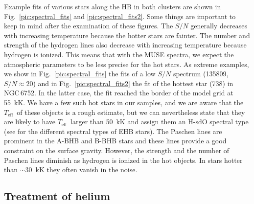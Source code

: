 \documentclass{aa}
\newcommand{\teff}{$T_{\text{eff}}$}
\newcommand{\ngc}{NGC\,6752}
\begin{document}
Example fits of various stars along the HB in both clusters are shown in Fig.~\ref{pic:spectral_fits} and \ref{pic:spectral_fits2}. 
Some things are important to keep in mind after the examination of these figures. The $S/N$ generally decreases with increasing temperature because the hotter stars are fainter. The number and strength of the hydrogen lines also decrease with increasing temperature because hydrogen is ionized. This means that with the MUSE spectra, we expect the atmospheric parameters to be less precise for the hot stars. As extreme examples, we show in Fig.~\ref{pic:spectral_fits} the fits of a low $S/N$ spectrum (135809, $S/N \approx 20$) and in Fig.~\ref{pic:spectral_fits2} the fit of the hottest star (738) in \ngc. In the latter case, the fit reached the border of the model grid at 55~kK. We have a few such hot stars in our samples, and we are aware that the \teff\ of these objects is a rough estimate, but we can nevertheless state that they are likely to have \teff\ larger than 50~kK and assign them an H-sdO spectral type (see \citealt{latour2018} for the different spectral types of EHB stars). The Paschen lines are prominent in the A-BHB and B-BHB stars and these lines provide a good constraint on the surface gravity. However, the strength and the number of Paschen lines diminish as hydrogen is ionized in the hot objects. In stars hotter than   $\sim$30~kK they often vanish in the noise. 

\subsection{Treatment of helium}\label{subsec:helium}
\end{document}

